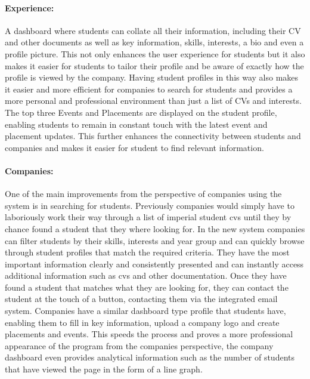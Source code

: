 \paragraph{Experience:}
  A dashboard where students can collate all their information, including their CV and other documents as well as key information, skills, interests, a bio and even a profile picture. This not only enhances the user experience for students but it also makes it easier for students to tailor their profile and be aware of exactly how the profile is viewed by the company. Having student profiles in this way also makes it easier and more efficient for companies to search for students and provides a more personal and professional environment than just a list of CVs and interests. The top three Events and Placements are displayed on the student profile, enabling students to remain in constant touch with the latest event and placement updates. This further enhances the connectivity between students and companies and makes it easier for student to find relevant information.

\paragraph{Companies:}
  One of the main improvements from the perspective of companies using the system is in searching for students. Previously companies would simply have to laboriously work their way through a list of imperial student cvs until they by chance found a student that they where looking for. In the new system companies can filter students by their skills, interests and year group and can quickly browse through student profiles that match the required criteria. They have the most important information clearly and consistently presented and can instantly access additional information such as cvs and other documentation. Once they have found a student that matches what they are looking for, they can contact the student at the touch of a button, contacting them via the integrated email system.
  Companies have a similar dashboard type profile that students have, enabling them to fill in key information, upload a company logo and create placements and events. This speeds the process and proves a more professional appearance of the program from the companies perspective, the company dashboard even provides analytical information such as the number of students that have viewed the page in the form of a line graph. 

